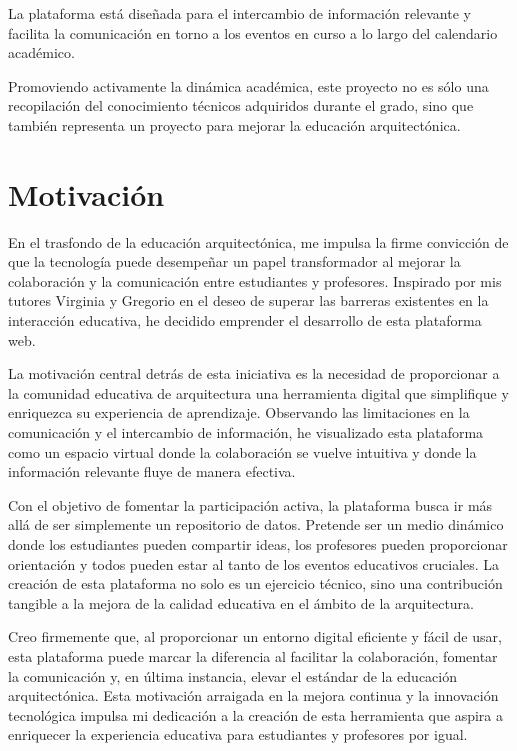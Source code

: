 \documentclass[a4paper, 12pt]{book}
\begin{document}
La plataforma está diseñada para el intercambio de información relevante y facilita la comunicación en torno a los eventos en curso a 
lo largo del calendario académico.

Promoviendo activamente la dinámica académica, este proyecto no es sólo una recopilación del conocimiento técnicos adquiridos durante 
el grado, sino que también representa un proyecto para mejorar la educación arquitectónica. 

\section{Motivación}
\label{sec:seccion}


En el trasfondo de la educación arquitectónica, me impulsa la firme convicción de que la tecnología puede desempeñar un papel transformador al mejorar la colaboración y la comunicación entre estudiantes y profesores. Inspirado por mis tutores Virginia y Gregorio en el deseo de superar las barreras existentes en la interacción educativa, he decidido emprender el desarrollo de esta plataforma web.

La motivación central detrás de esta iniciativa es la necesidad de proporcionar a la comunidad educativa de arquitectura una herramienta digital que simplifique y enriquezca su experiencia de aprendizaje. Observando las limitaciones en la comunicación y el intercambio de información, he visualizado esta plataforma como un espacio virtual donde la colaboración se vuelve intuitiva y donde la información relevante fluye de manera efectiva.

Con el objetivo de fomentar la participación activa, la plataforma busca ir más allá de ser simplemente un repositorio de datos. Pretende ser un medio dinámico donde los estudiantes pueden compartir ideas, los profesores pueden proporcionar orientación y todos pueden estar al tanto de los eventos educativos cruciales. La creación de esta plataforma no solo es un ejercicio técnico, sino una contribución tangible a la mejora de la calidad educativa en el ámbito de la arquitectura.

Creo firmemente que, al proporcionar un entorno digital eficiente y fácil de usar, esta plataforma puede marcar la diferencia al facilitar la colaboración, fomentar la comunicación y, en última instancia, elevar el estándar de la educación arquitectónica. Esta motivación arraigada en la mejora continua y la innovación tecnológica impulsa mi dedicación a la creación de esta herramienta que aspira a enriquecer la experiencia educativa para estudiantes y profesores por igual.
\end{document}
